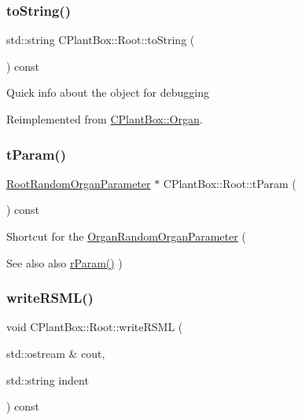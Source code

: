 \subsubsection{\texorpdfstring{to\+String()}{toString()}}
{\footnotesize\ttfamily std\+::string C\+Plant\+Box\+::\+Root\+::to\+String (\begin{DoxyParamCaption}{ }\end{DoxyParamCaption}) const\hspace{0.3cm}{\ttfamily [virtual]}}

Quick info about the object for debugging 

Reimplemented from \hyperlink{classCPlantBox_1_1Organ_a9f823aebd19519096e899e65604f239f}{C\+Plant\+Box\+::\+Organ}.

\mbox{\label{classCPlantBox_1_1Root_aeb5347a24006bd11fd6917a8ade87694}} 
\subsubsection{\texorpdfstring{t\+Param()}{tParam()}}
{\footnotesize\ttfamily \hyperlink{classCPlantBox_1_1RootRandomOrganParameter}{Root\+Random\+Organ\+Parameter} $\ast$ C\+Plant\+Box\+::\+Root\+::t\+Param (\begin{DoxyParamCaption}{ }\end{DoxyParamCaption}) const}

Shortcut for the \hyperlink{classCPlantBox_1_1OrganRandomOrganParameter}{Organ\+Random\+Organ\+Parameter} (\begin{DoxySeeAlso}{See also}
also \hyperlink{classCPlantBox_1_1Root_a195c7b712cf32e6593eafb9ca1f69c2a}{r\+Param()} ) 
\end{DoxySeeAlso}
\mbox{\label{classCPlantBox_1_1Root_accf492ad0fa522fccc43588d1cde4610}} 
\subsubsection{\texorpdfstring{write\+R\+S\+M\+L()}{writeRSML()}}
{\footnotesize\ttfamily void C\+Plant\+Box\+::\+Root\+::write\+R\+S\+ML (\begin{DoxyParamCaption}\item[{std\+::ostream \&}]{cout,  }\item[{std\+::string}]{indent }\end{DoxyParamCaption}) const\hspace{0.3cm}{\ttfamily [virtual]}}



